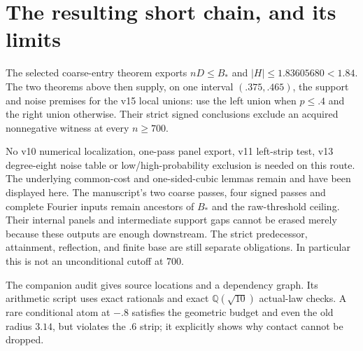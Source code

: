 \documentclass[11pt]{article}
\begin{document}
\section*{The resulting short chain, and its limits}
The selected coarse-entry theorem exports $nD\le B_*$ and
$|H|\le1.83605680<1.84$. The two theorems above then supply, on one
interval $(.375,.465)$, the support and noise premises for the v15 local
unions: use the left union when $p\le.4$ and the right union otherwise.
Their strict signed conclusions exclude an acquired nonnegative witness
at every $n\ge700$.

No v10 numerical localization, one-pass panel export, v11 left-strip test,
v13 degree-eight noise table or low/high-probability exclusion is needed
on this route. The underlying common-cost and one-sided-cubic lemmas remain
and have been displayed here. The manuscript's two coarse passes, four
signed passes and complete Fourier inputs remain ancestors of $B_*$ and
the raw-threshold ceiling. Their internal panels and intermediate support
gaps cannot be erased merely because these outputs are enough downstream.
The strict predecessor, attainment, reflection, and finite base are still
separate obligations. In particular this is not an unconditional cutoff at 700.

The companion audit gives source locations and a dependency graph. Its
arithmetic script uses exact rationals and exact $\mathbb Q(\sqrt{10})$
actual-law checks. A rare conditional atom at $-.8$ satisfies the geometric
budget and even the old radius $3.14$, but violates the $.6$ strip; it
explicitly shows why contact cannot be dropped.
\end{document}
